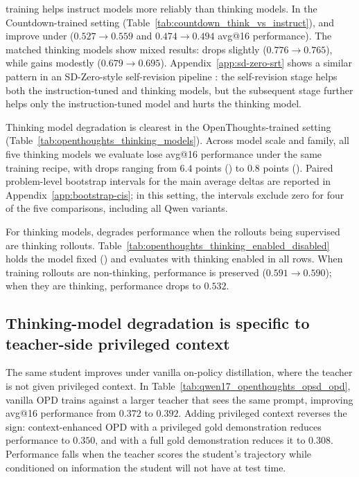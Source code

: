 





\opsd{} training helps instruct models more reliably than
thinking models. In the Countdown-trained setting
(Table~\ref{tab:countdown_think_vs_instruct}), \qwenfourbinstruct{} and
\olmosevenbinstruct{} improve under \opsd{} ($0.527 \to 0.559$ and
$0.474 \to 0.494$ avg@16 performance). The matched thinking models show mixed
results: \qwenfourbthink{} drops slightly ($0.776 \to 0.765$), while
\olmosevenbthink{} gains modestly ($0.679 \to 0.695$).
Appendix~\ref{app:sd-zero-srt} shows a similar pattern in an SD-Zero-style
self-revision pipeline \citep{he2026selfdistillationzero}: the self-revision
stage helps both the instruction-tuned and thinking models, but the subsequent
\opsd{} stage further helps only the instruction-tuned model and hurts the
thinking model.

Thinking model degradation is clearest in the OpenThoughts-trained setting
(Table~\ref{tab:openthoughts_thinking_models}). Across model scale and family,
all five thinking models we evaluate lose avg@16 performance under the same
training recipe, with drops ranging from $6.4$ points (\qwenonesevenb{}) to
$0.8$ points (\olmosevenbthink{}).
Paired problem-level bootstrap intervals for the main average deltas are
reported in Appendix~\ref{app:bootstrap-cis}; in this setting, the intervals
exclude zero for four of the five comparisons, including all Qwen variants.

For thinking models, \opsd{} degrades performance when the rollouts being supervised are thinking rollouts.
Table~\ref{tab:openthoughts_thinking_enabled_disabled} holds
the model fixed (\qwenfourb{}) and evaluates with thinking enabled in all rows.
When training rollouts are non-thinking, performance is preserved ($0.591 \to 0.590$); when they are thinking, performance drops to $0.532$.

\subsection{Thinking-model degradation is specific to teacher-side privileged context}



The same student improves under vanilla on-policy distillation, where the teacher is
not given privileged context. In
Table~\ref{tab:qwen17_openthoughts_opsd_opd}, vanilla OPD trains
\qwenonesevenb{} against a larger teacher that sees the same prompt, improving
avg@16 performance from $0.372$ to $0.392$. Adding privileged context reverses
the sign: context-enhanced OPD with a privileged gold demonstration reduces
performance to $0.350$, and \opsd{} with a full gold demonstration reduces it
to $0.308$. Performance falls when
the teacher scores the student's trajectory while conditioned on information the
student will not have at test time.

